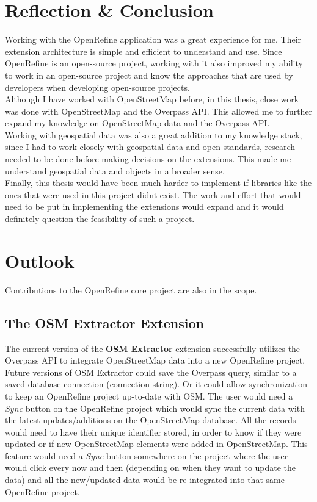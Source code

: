 \section{Reflection \& Conclusion}
Working with the OpenRefine application was a great experience for me. Their extension architecture is simple and efficient to understand and use.
Since OpenRefine is an open-source project, working with it also improved my ability to work in an open-source project
and know the approaches that are used by developers when developing open-source projects.\\
\newline
Although I have worked with OpenStreetMap before, in this thesis, close work was done with OpenStreetMap and the Overpass API. This allowed me to further
expand my knowledge on OpenStreetMap data and the Overpass API.\\
\newline
Working with geospatial data was also a great addition to my knowledge stack, since I had to work closely with geospatial data and open standards,
research needed to be done before making decisions on the extensions. This made me understand geospatial data and objects in a broader sense.\\
\newline
Finally, this thesis would have been much harder to implement if libraries like the ones that were used in this project didn\textquotesingle t exist. The work and effort
that would need to be put in implementing the extensions would expand and it would definitely question the feasibility of such a project.
\section{Outlook}
Contributions to the OpenRefine core project are also in the scope.
\subsection{The OSM Extractor Extension}
The current version of the \textbf{OSM Extractor} extension successfully utilizes the Overpass API to integrate OpenStreetMap data into a new OpenRefine project. Future versions of OSM Extractor could save the Overpass query, similar to a saved database connection (connection string). Or it could allow synchronization to keep an OpenRefine
project up-to-date with OSM. The user would need a \textit{Sync} button on the OpenRefine project which would sync the current data with the latest updates/additions on the OpenStreetMap database. All the records would need to have their unique identifier stored, in order to know if they were updated or if new OpenStreetMap elements were added in OpenStreetMap. This feature would need a \textit{Sync} button somewhere on the project
where the user would click every now and then (depending on when they want to update the data) and all the new/updated data would be re-integrated into that same OpenRefine project.
